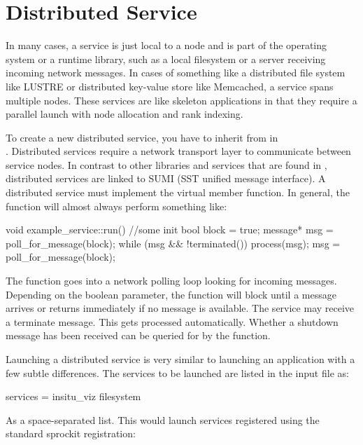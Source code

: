 \section{Distributed Service}
\label{sec:distService}
In many cases, a service is just local to a node and is part of the operating system or a runtime library, such as a local filesystem or a server receiving incoming network messages.  In cases of something like a distributed file system like LUSTRE or distributed key-value store like Memcached, a service spans multiple nodes.  These services are like skeleton applications in that they require a parallel launch with node allocation and rank indexing.

To create a new distributed service, you have to inherit from  in \\
.  
Distributed services require a network transport layer to communicate between service nodes.
In contrast to other libraries and services that are found in , distributed services are linked to SUMI (SST unified message interface).
A distributed service must implement the  virtual member function.
In general, the  function will almost always perform something like:

\begin{CppCode}
void example_service::run()
{
 //some init
 bool block  = true;
 message* msg = poll_for_message(block);
 while (msg && !terminated()){
   process(msg);
   msg = poll_for_message(block);
 }
}
\end{CppCode}
The function  goes into a network polling loop looking for incoming messages.
Depending on the boolean parameter, the function will block until a message arrives or returns immediately if no message is available.
The service may receive a terminate message.
This gets processed automatically.
Whether a shutdown message has been received can be queried for by the  function.

Launching a distributed service is very similar to launching an application with a few subtle differences.
The services to be launched are listed in the input file as:

\begin{ViFile}
services = insitu_viz filesystem
\end{ViFile}
As a space-separated list.
This would launch services registered using the standard sprockit registration:

